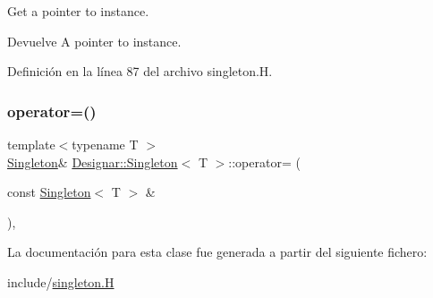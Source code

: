 Get a pointer to instance.

\begin{DoxyReturn}{Devuelve}
A pointer to instance. 
\end{DoxyReturn}


Definición en la línea 87 del archivo singleton.\+H.

\mbox{\label{class_designar_1_1_singleton_a8968c625d740c01211ec483142e52a58}} 
\subsubsection{\texorpdfstring{operator=()}{operator=()}}
{\footnotesize\ttfamily template$<$typename T $>$ \\
\hyperlink{class_designar_1_1_singleton}{Singleton}\& \hyperlink{class_designar_1_1_singleton}{Designar\+::\+Singleton}$<$ T $>$\+::operator= (\begin{DoxyParamCaption}\item[{const \hyperlink{class_designar_1_1_singleton}{Singleton}$<$ T $>$ \&}]{ }\end{DoxyParamCaption})\hspace{0.3cm}{\ttfamily [protected]}, {\ttfamily [delete]}}



La documentación para esta clase fue generada a partir del siguiente fichero\+:\begin{DoxyCompactItemize}
\item 
include/\hyperlink{singleton_8_h}{singleton.\+H}\end{DoxyCompactItemize}
